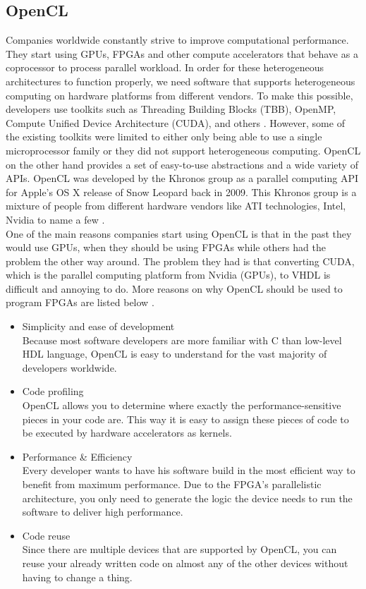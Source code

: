 \documentclass[a4paper, 11pt]{report}
\begin{document}
\subsection{OpenCL}\label{subsec:OpenCL}

Companies worldwide constantly strive to improve computational performance. They start using GPUs, FPGAs and other compute accelerators that behave as a coprocessor to process parallel workload. In order for these heterogeneous architectures to function properly, we need software that supports heterogeneous computing on hardware platforms from different vendors. To make this possible, developers use toolkits such as Threading Building Blocks (TBB), OpenMP, Compute Unified Device Architecture (CUDA), and others \cite{stone2010opencl}. However, some of the existing toolkits were limited to either only being able to use a single microprocessor family or they did not support heterogeneous computing. OpenCL on the other hand provides a set of easy-to-use abstractions and a wide variety of APIs. OpenCL was developed by the Khronos group as a parallel computing API for Apple's OS X release of Snow Leopard back in 2009. This Khronos group is a mixture of people from different hardware vendors like ATI technologies, Intel, Nvidia to name a few \cite{KhronosMembers}.\\
One of the main reasons companies start using OpenCL is that in the past they would use GPUs, when they should be using FPGAs while others had the problem the other way around. The problem they had is that converting CUDA, which is the parallel computing platform from Nvidia (GPUs), to VHDL is difficult and annoying to do. More reasons on why OpenCL should be used to program FPGAs are listed below \cite{FPGAforDummies}.
\begin{itemize}
	\item {Simplicity and ease of development}\\
	Because most software developers are more familiar with C than low-level HDL language, OpenCL is easy to understand for the vast majority of developers worldwide.
	\item {Code profiling}\\
OpenCL allows you to determine where exactly the performance-sensitive pieces in your code are. This way it is easy to assign these pieces of code to be executed by hardware accelerators as kernels.
	\item {Performance \& Efficiency}\\
Every developer wants to have his software build in the most efficient way to benefit from maximum performance. Due to the FPGA's parallelistic architecture, you only need to generate the logic the device needs to run the software to deliver high performance.
	\item {Code reuse}\\
Since there are multiple devices that are supported by OpenCL, you can reuse your already written code on almost any of the other devices without having to change a thing.
\end{itemize}
\end{document}
